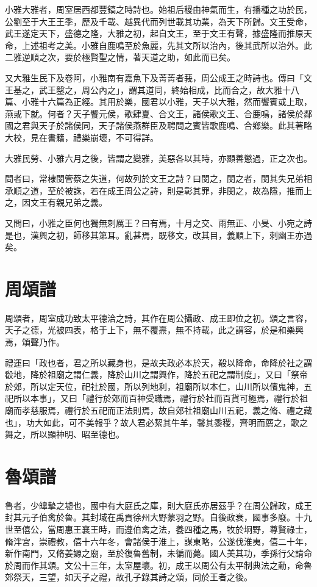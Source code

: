 小雅大雅者，周室居西都豐鎬之時詩也。始祖后稷由神氣而生，有播種之功於民，公劉至于大王王季，歷及千載、越異代而列世載其功業，為天下所歸。文王受命，武王遂定天下，盛德之隆，大雅之初，起自文王，至于文王有聲，據盛隆而推原天命，上述祖考之美。小雅自鹿鳴至於魚麗，先其文所以治內，後其武所以治外。此二雅逆順之次，要於極賢聖之情，著天道之助，如此而已矣。

又大雅生民下及卷阿，小雅南有嘉魚下及菁菁者莪，周公成王之時詩也。傳曰「文王基之，武王鑿之，周公內之」，謂其道同，終始相成，比而合之，故大雅十八篇、小雅十六篇為正經。其用於樂，國君以小雅，天子以大雅，然而饗賓或上取，燕或下就。何者？天子饗元侯，歌肆夏、合文王，諸侯歌文王、合鹿鳴，諸侯於鄰國之君與天子於諸侯同，天子諸侯燕群臣及聘問之賓皆歌鹿鳴、合鄉樂。此其著略大校，見在書籍，禮樂崩壞，不可得詳。

大雅民勞、小雅六月之後，皆謂之變雅，美惡各以其時，亦顯善懲過，正之次也。

問者曰，常棣閔管蔡之失道，何故列於文王之詩？曰閔之，閔之者，閔其失兄弟相承順之道，至於被誅，若在成王周公之詩，則是彰其罪，非閔之，故為隱，推而上之，因文王有親兄弟之義。

又問曰，小雅之臣何也獨無刺厲王？曰有焉，十月之交、雨無正、小旻、小宛之詩是也，漢興之初，師移其第耳。亂甚焉，既移文，改其目，義順上下，刺幽王亦過矣。

\section*{周頌譜}

周頌者，周室成功致太平德洽之詩，其作在周公攝政、成王即位之初。頌之言容，天子之德，光被四表，格于上下，無不覆燾，無不持載，此之謂容，於是和樂興焉，頌聲乃作。

禮運曰「政也者，君之所以藏身也，是故夫政必本於天，殽以降命，命降於社之謂殽地，降於祖廟之謂仁義，降於山川之謂興作，降於五祀之謂制度」，又曰「祭帝於郊，所以定天位，祀社於國，所以列地利，祖廟所以本仁，山川所以儐鬼神，五祀所以本事」，又曰「禮行於郊而百神受職焉，禮行於社而百貨可極焉，禮行於祖廟而孝慈服焉，禮行於五祀而正法則焉，故自郊社祖廟山川五祀，義之脩、禮之藏也」，功大如此，可不美報乎？故人君必絜其牛羊，馨其黍稷，齊明而薦之，歌之舞之，所以顯神明、昭至德也。

\section*{魯頌譜}

魯者，少皥摯之墟也，國中有大庭氏之庫，則大庭氏亦居茲乎？在周公歸政，成王封其元子伯禽於魯。其封域在禹貢徐州大野蒙羽之野。自後政衰，國事多廢。十九世至僖公，當周惠王襄王時，而遵伯禽之法，養四種之馬，牧於坰野，尊賢祿士，脩泮宮，崇禮教，僖十六年冬，會諸侯于淮上，謀東略，公遂伐淮夷，僖二十年，新作南門，又脩姜嫄之廟，至於復魯舊制，未徧而薨。國人美其功，季孫行父請命於周而作其頌。文公十三年，太室屋壞。初，成王以周公有太平制典法之勳，命魯郊祭天，三望，如天子之禮，故孔子錄其詩之頌，同於王者之後。


